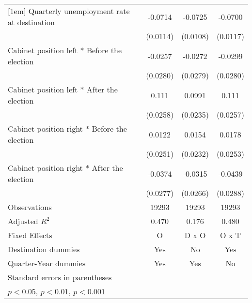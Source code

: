 \begin{table}[htbp]
\begin{tabular}{l*{3}{c}}
[1em]
Quarterly unemployment rate at destination&     -0.0714\sym{***}&     -0.0725\sym{***}&     -0.0700\sym{***}\\
                    &    (0.0114)         &    (0.0108)         &    (0.0117)         \\
[1em]
Cabinet position left * Before the election&     -0.0257         &     -0.0272         &     -0.0299         \\
                    &    (0.0280)         &    (0.0279)         &    (0.0280)         \\
[1em]
Cabinet position left * After the election&       0.111\sym{***}&      0.0991\sym{***}&       0.111\sym{***}\\
                    &    (0.0258)         &    (0.0235)         &    (0.0257)         \\
[1em]
Cabinet position right * Before the election&      0.0122         &      0.0154         &      0.0178         \\
                    &    (0.0251)         &    (0.0232)         &    (0.0253)         \\
[1em]
Cabinet position right * After the election&     -0.0374         &     -0.0315         &     -0.0439         \\
                    &    (0.0277)         &    (0.0266)         &    (0.0288)         \\
\hline
Observations        &       19293         &       19293         &       19293         \\
Adjusted \(R^{2}\)  &       0.470         &       0.176         &       0.480         \\
Fixed Effects       &           O         &       D x O         &       O x T         \\
Destination dummies &         Yes         &          No         &         Yes         \\
Quarter-Year dummies&         Yes         &         Yes         &          No         \\
\hline\hline
\multicolumn{4}{l}{\footnotesize Standard errors in parentheses}\\
\multicolumn{4}{l}{\footnotesize \sym{*} \(p<0.05\), \sym{**} \(p<0.01\), \sym{***} \(p<0.001\)}\\
\end{tabular}
\end{table}

